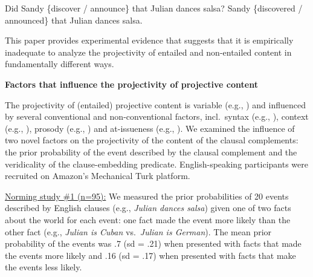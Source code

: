 \documentclass[12pt,fleqn]{article}
\newcommand{\6}{\mbox{$[\hspace*{-.6mm}[$}}
\newcommand{\9}{\mbox{$]\hspace*{-.6mm}]$}}
\begin{document}
\vspace*{-.2cm}
\begin{exe}
\ex
\begin{xlist}
\ex\label{embedded} Did Sandy \{discover / announce\} that Julian dances salsa?
\ex\label{unembedded} Sandy \{discovered / announced\} that Julian dances salsa.
\end{xlist}
\end{exe}
\vspace*{-.2cm}

This paper provides experimental evidence that suggests that it is empirically inadequate to analyze the projectivity of entailed and non-entailed content in fundamentally different ways. 

{\bf Factors that influence the projectivity of projective content}

The projectivity of (entailed) projective content is variable (e.g., \citealt{karttunen71b,kadmon01,tbd-variability}) and influenced by several conventional and non-conventional factors, incl.\ syntax (e.g., \citealt{potts05}), context (e.g., \citealt{beaver-belly}), prosody (e.g., \citealt{cummins-rohde2015,tonhauser-salt26}) and at-issueness (e.g., \citealt{tbd-variability}). We examined the influence of two novel factors on the projectivity of the content of the clausal complements: the prior probability of the event described by the clausal complement and the veridicality of the clause-embedding predicate. English-speaking participants were recruited on Amazon's Mechanical Turk platform.

\vspace*{.7ex}

\underline{Norming study \#1 (n=95):} We measured the prior probabilities of 20 events described by English clauses (e.g., {\em Julian dances salsa}) given one of two facts about the world for each event: one fact made the event more likely than the other fact (e.g., {\em Julian is Cuban} vs.\ {\em Julian is German}). The mean prior probability of the events was .7 (sd = .21) when presented with facts that made the events more likely and .16 (sd = .17) when presented with facts that make the events less likely.

\vspace*{.7ex}
\end{document}
